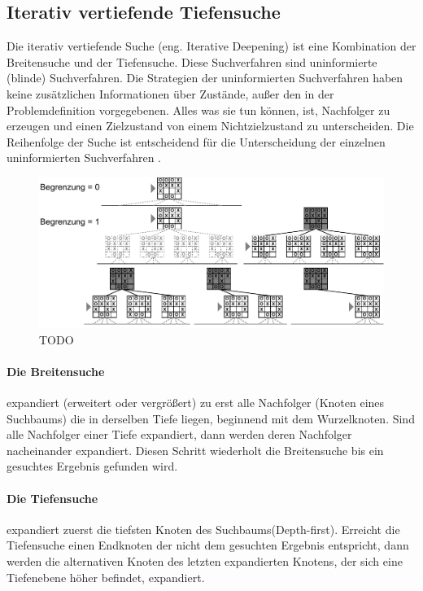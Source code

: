 \subsection{Iterativ vertiefende Tiefensuche}
\label{subsec:Iterativ vertiefende Tiefensuche}
Die iterativ vertiefende Suche (eng. Iterative Deepening) ist eine Kombination der Breitensuche und der Tiefensuche. Diese Suchverfahren sind uninformierte (blinde) Suchverfahren. Die Strategien der uninformierten Suchverfahren haben keine zusätzlichen Informationen über Zustände, außer den in der Problemdefinition vorgegebenen. Alles was sie tun können, ist, Nachfolger zu erzeugen und einen Zielzustand von einem Nichtzielzustand zu unterscheiden. Die Reihenfolge der Suche ist entscheidend für die Unterscheidung der einzelnen uninformierten Suchverfahren \cite[116]{Russell}. \\
 
\begin{figure}[!htbp]
  \centering
  \includegraphics[scale = 0.9]{inhalt/abbildungen/iterative_deepening_tictactoe.pdf}
  \caption{TODO }
  \label{fig:minimax_tictactoe}
\end{figure}  
 
\paragraph{Die Breitensuche} expandiert (erweitert oder vergrößert) zu erst alle Nachfolger (Knoten eines Suchbaums) die in derselben Tiefe liegen, beginnend mit dem Wurzelknoten. Sind alle Nachfolger einer Tiefe expandiert, dann werden deren Nachfolger nacheinander expandiert. Diesen Schritt wiederholt die Breitensuche bis ein gesuchtes Ergebnis gefunden wird. \\

\paragraph{Die Tiefensuche} expandiert zuerst die tiefsten Knoten des Suchbaums(Depth-first). Erreicht die Tiefensuche einen Endknoten der nicht dem gesuchten Ergebnis entspricht, dann werden die alternativen Knoten des letzten expandierten Knotens, der sich eine Tiefenebene höher befindet, expandiert. \\

